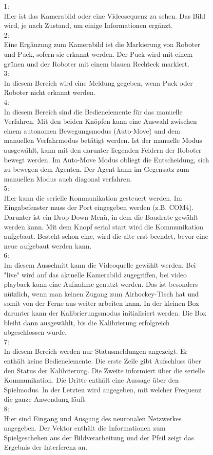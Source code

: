\begin{figure}
1:\\
Hier ist das Kamerabild oder eine Videosequenz zu sehen. Das Bild wird, je nach Zustand, um einige Informationen ergänzt.\\
2:\\

Eine Ergänzung zum Kamerabild ist die Markierung von Roboter und Puck, sofern sie erkannt werden. Der Puck wird mit einem grünen und der Roboter mit einem blauen Rechteck markiert.
\\
3:\\
In diesem Bereich wird eine Meldung gegeben, wenn Puck oder Roboter nicht erkannt werden.\\
4:\\
In diesem Bereich sind die Bedienelemente für das manuelle Verfahren. Mit den beiden Knöpfen kann eine Auswahl zwischen einem autonomen Bewegungsmodus (Auto-Move) und dem manuellen Verfahrmodus betätigt werden. Ist der manuelle Modus ausgewählt, kann mit den darunter liegenden Feldern der Roboter bewegt werden. Im Auto-Move Modus obliegt die Entscheidung, sich zu bewegen dem Agenten. Der Agent kann im Gegensatz zum manuellen Modus auch diagonal verfahren. \\
5:\\
Hier kann die serielle Kommunikation gesteuert werden. Im Eingabefenster muss der Port eingegeben werden (z.B. COM4). Darunter ist ein Drop-Down Menü, in dem die Baudrate gewählt werden kann. Mit dem Knopf serial start wird die Kommunikation aufgebaut. Besteht schon eine, wird die alte erst beendet, bevor eine neue aufgebaut werden kann.\\
6:\\
Im diesem Ausschnitt kann die Videoquelle gewählt werden. Bei "live" wird auf das aktuelle Kamerabild zugegriffen, bei video playback kann eine Aufnahme genutzt werden. Das ist besonders nützlich, wenn man keinen Zugang zum Airhockey-Tisch hat und somit von der Ferne aus weiter arbeiten kann. In der kleinen Box darunter kann der Kalibrierungsmodus initialisiert werden. Die Box bleibt dann ausgewählt, bis die Kalibrierung erfolgreich abgeschlossen wurde.\\
7:\\
In diesem Bereich werden nur Statusmeldungen angezeigt. Er enthält keine Bedienelemente. Die erste Zeile gibt Aufschluss über den Status der Kalibrierung. Die Zweite informiert über die serielle Kommunikation. Die Dritte enthält eine Aussage über den Spielmodus. In der Letzten wird angegeben, mit welcher Frequenz die ganze Anwendung läuft.\\
8:\\
Hier sind Eingang und Ausgang des neuronalen Netzwerkes angegeben. Der Vektor enthält die Informationen zum Spielgeschehen aus der Bildverarbeitung und der Pfeil zeigt das Ergebnis der Interferenz an. 
\end{figure}
\clearpage

